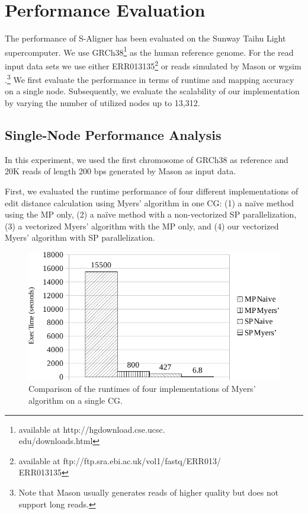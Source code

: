 \section{Performance Evaluation}
\label{Evaluation}

The performance of S-Aligner has been evaluated on the Sunway Taihu
Light supercomputer. We use GRCh38\footnote{available at
  http://hgdownload.cse.ucsc.\\edu/downloads.html} as the human
reference genome.  For the read input data sets we use either
ERR013135\footnote{available at
  ftp://ftp.sra.ebi.ac.uk/vol1/fastq/ERR013/\\ERR013135} or reads
simulated by Mason \cite{mason} or wgsim \cite{wgsim}.\footnote{Note
  that Mason usually generates reads of higher quality but does not
  support long reads.}  We first evaluate the performance in terms of
runtime and mapping accuracy on a single node. Subsequently, we
evaluate the scalability of our implementation by varying the number
of utilized nodes up to 13,312.

\subsection{Single-Node Performance Analysis}

In this experiment, we used the first chromosome of GRCh38 as
reference and 20K reads of length 200 bps generated by Mason as input
data.

First, we evaluated the runtime performance of four different
implementations of edit distance calculation using Myers' algorithm in
one CG: (1) a na\"ive method using the MP only, (2) a na\"ive method
with a non-vectorized SP parallelization, (3) a vectorized Myers'
algorithm with the MP only, and (4) our vectorized Myers' algorithm
with SP parallelization.

\begin{figure}[!htb]
  \begin{center}
    \includegraphics[width=1\linewidth]{figures/VarVerCha}
    \caption{Comparison of the runtimes of four implementations of
      Myers' algorithm on a single CG.}
    \label{VarVerCha}
  \end{center}
\end{figure}

